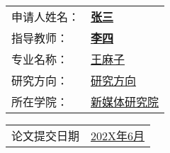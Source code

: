 \vspace{50pt}

\begin{center}
     \songti
    \begin{tabularx}{.6\textwidth}{>{\songti}l >{\songti}X<{\centering}}
        申请人姓名： & \bfseries \uline{\hfill 张三 \hfill}        \\
        指导教师：   & \bfseries \uline{\hfill 李四 \hfill} \hfill \\
        专业名称：   & \uline{\hfill 王麻子 \hfill}                \\
        研究方向：   & \uline{\hfill 研究方向 \hfill}              \\
        所在学院：   & \uline{\hfill 新媒体研究院 \hfill}          \\
    \end{tabularx}
\end{center}

\vspace{40pt}

\begin{center}
     \bfseries
    \begin{tabularx}{.5\textwidth}{>{\songti}l >{\songti}X<{\centering}}
        论文提交日期 & \uline{\hfill 202X年6月 \hfill}
    \end{tabularx}
\end{center}

\restoregeometry
